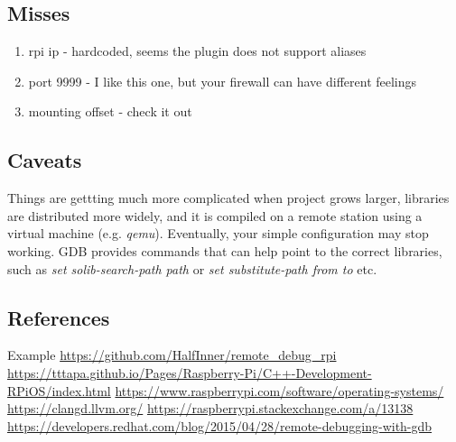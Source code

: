 \documentclass[twocolumn, 10pt]{article}
\begin{document}
\subsection*{Misses}
\begin{enumerate}
  \item rpi ip - hardcoded, seems the plugin does not support aliases
  \item port 9999 - I like this one, but your firewall can have different feelings
  \item mounting offset - check it\cite{bib:mounting-approach} out
\end{enumerate}

\subsection*{Caveats}
Things are gettting much more complicated when project grows larger,
  libraries are distributed more widely, and it is compiled on a remote
  station using a virtual machine (e.g. \textit{qemu}). Eventually, your simple configuration may stop working.
  GDB provides commands that can help point to the correct libraries, 
  such as \textit{set solib-search-path path} or
  \textit{set substitute-path from to} etc.


\subsection*{References}
\begin{enumerate}[label={[\arabic*]}]
  \tiny
   Example \url{https://github.com/HalfInner/remote_debug_rpi}
   \url{https://tttapa.github.io/Pages/Raspberry-Pi/C++-Development-RPiOS/index.html}
   \url{https://www.raspberrypi.com/software/operating-systems/}
   \url{https://clangd.llvm.org/}
   \url{https://raspberrypi.stackexchange.com/a/13138}
   \url{https://developers.redhat.com/blog/2015/04/28/remote-debugging-with-gdb}
\end{enumerate}
\end{document}
